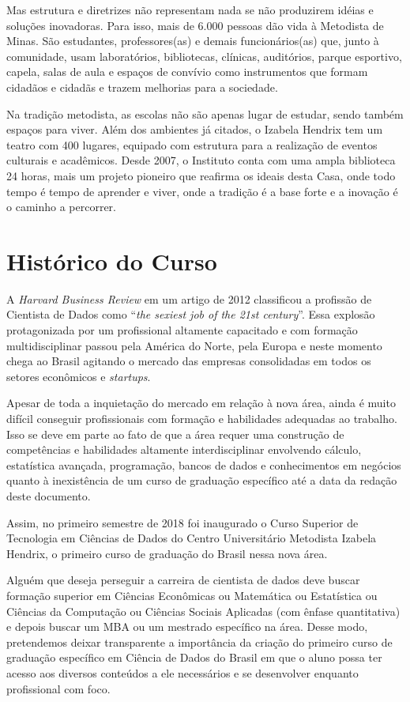 \documentclass[a4paper, 12pt, openright, oneside, german, french, english, brazil]{abntex2}
\begin{document}
Mas estrutura e diretrizes não representam nada se não produzirem idéias e soluções inovadoras. Para isso, mais de 6.000 pessoas dão vida à Metodista de Minas. São estudantes, professores(as) e demais funcionários(as) que, junto à comunidade, usam laboratórios, bibliotecas, clínicas, auditórios, parque esportivo, capela, salas de aula e espaços de convívio como instrumentos que formam cidadãos e cidadãs e trazem melhorias para a sociedade.

Na tradição metodista, as escolas não são apenas lugar de estudar, sendo também espaços para viver. Além dos ambientes já citados, o Izabela Hendrix tem um teatro com 400 lugares, equipado com estrutura para a realização de eventos culturais e acadêmicos. Desde 2007, o Instituto conta com uma ampla biblioteca 24 horas, mais um projeto pioneiro que reafirma os ideais desta Casa, onde todo tempo é tempo de aprender e viver, onde a tradição é a base forte e a inovação é o caminho a percorrer.

\section{Histórico do Curso}

A \textit{Harvard Business Review} em um artigo de 2012 classificou a profissão de Cientista de Dados como ``\textit{the sexiest job of the 21st century}''. Essa explosão protagonizada por um profissional altamente capacitado e com formação multidisciplinar passou pela América do Norte, pela Europa e neste momento chega ao Brasil agitando o mercado das empresas consolidadas em todos os setores econômicos e \textit{startups}.

Apesar de toda a inquietação do mercado em relação à nova área, ainda é muito difícil conseguir profissionais com formação e habilidades adequadas ao trabalho. Isso se deve em parte ao fato de que a área requer uma construção de competências e habilidades altamente interdisciplinar envolvendo cálculo, estatística avançada, programação, bancos de dados e conhecimentos em negócios quanto à inexistência de um curso de graduação específico até a data da redação deste documento.

Assim, no primeiro semestre de 2018 foi inaugurado o Curso Superior de Tecnologia em Ciências de Dados do Centro Universitário Metodista Izabela Hendrix, o primeiro curso de graduação do Brasil nessa nova área. 

Alguém que deseja perseguir a carreira de cientista de dados deve buscar formação superior em Ciências Econômicas ou Matemática ou Estatística ou Ciências da Computação ou Ciências Sociais Aplicadas (com ênfase quantitativa) e depois buscar um MBA ou um mestrado específico na área. Desse modo, pretendemos deixar transparente a importância da criação do primeiro curso de graduação específico em Ciência de Dados do Brasil em que o aluno possa ter acesso aos diversos conteúdos a ele necessários e se desenvolver enquanto profissional com foco.
\end{document}

